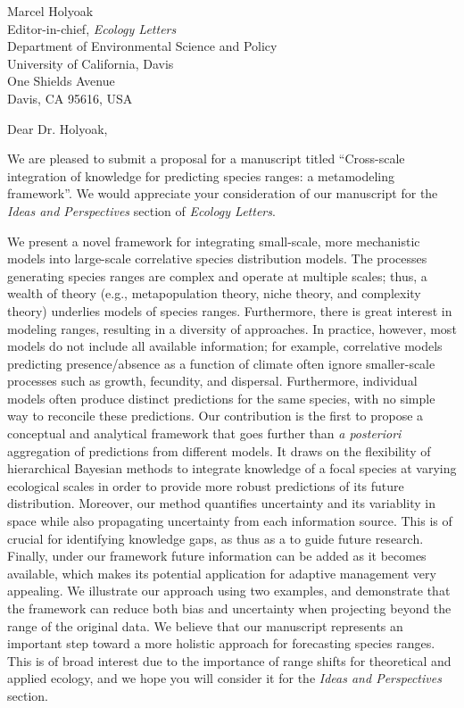 \documentclass[11pt]{letter}
\begin{document}

\begin{letter}{Marcel Holyoak \\ 
	Editor-in-chief, \emph{Ecology Letters} \\ 
	Department of Environmental Science and Policy \\
	University of California, Davis \\
	One Shields Avenue \\
	Davis, CA 95616, USA }

\opening{Dear Dr. Holyoak,}

We are pleased to submit a proposal for a manuscript titled ``Cross-scale integration of knowledge for predicting species ranges: a metamodeling framework''. 
We would appreciate your consideration of our manuscript for the \emph{Ideas and Perspectives} section of \emph{Ecology Letters}.


We present a novel framework for integrating small-scale, more mechanistic models into large-scale correlative species distribution models.
The processes generating species ranges are complex and operate at multiple scales; thus, a wealth of theory (e.g., metapopulation theory, niche theory, and complexity theory) underlies models of species ranges.
Furthermore, there is great interest in modeling ranges, resulting in a diversity of approaches.
In practice, however, most models do not include all available information; for example, correlative models predicting presence/absence as a function of climate often ignore smaller-scale processes such as growth, fecundity, and dispersal.
Furthermore, individual models often produce distinct predictions for the same species, with no simple way to reconcile these predictions.
Our contribution is the first to propose a conceptual and analytical framework that goes further than \emph{a posteriori} aggregation of predictions from different models. 
It draws on the flexibility of hierarchical Bayesian methods to integrate knowledge of a focal species at varying ecological scales in order to provide more robust predictions of its future distribution.
Moreover, our method quantifies uncertainty and its variablity in space while also propagating uncertainty from each information source.
This is of crucial for identifying knowledge gaps, as thus as a to guide future research.
Finally, under our framework future information can be added as it becomes available, which makes its potential application for adaptive management very appealing.
We illustrate our approach using two examples, and demonstrate that the framework can reduce both bias and uncertainty when projecting beyond the range of the original data.
We believe that our manuscript represents an important step toward a more holistic approach for forecasting species ranges.
This is of broad interest due to the importance of range shifts for theoretical and applied ecology, and we hope you will consider it for the \emph{Ideas and Perspectives} section.


\end{letter}
\end{document}
